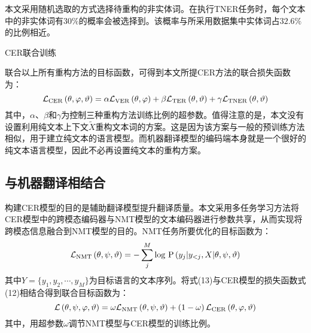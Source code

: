 本文采用随机选取的方式选择待重构的非实体词。在执行TNER任务时，每个文本中的非实体词有$30\%$的概率会被选择到。该概率与所采用数据集中实体词占$32.6\%$的比例相近。

{\sffamily CER联合训练}

联合以上所有重构方法的目标函数，可得到本文所提CER方法的联合损失函数为：
\begin{equation}
\mathcal{L}_{\rm{CER}} \left( \theta, \varphi, \vartheta \right) = \alpha \mathcal{L}_{\rm{VER}} \left( \theta, \varphi \right) + \beta \mathcal{L}_{\rm{TER}} \left( \theta, \vartheta \right) + \gamma \mathcal{L}_{\rm{TNER}} \left( \theta, \vartheta \right)
\end{equation}
其中，$\alpha$、$\beta$和$\gamma$为控制三种重构方法训练比例的超参数。值得注意的是，本文没有设置利用纯文本上下文$\tilde{X}$重构文本词的方案。这是因为该方案与一般的预训练方法相似，用于建立纯文本的语言模型。而机器翻译模型的编码端本身就是一个很好的纯文本语言模型，因此不必再设置纯文本的重构方案。

\subsection{与机器翻译相结合}
构建CER模型的目的是辅助翻译模型提升翻译质量。本文采用多任务学习方法将CER模型中的跨模态编码器与NMT模型的文本编码器进行参数共享，从而实现将跨模态信息融合到NMT模型的目的。NMT任务所要优化的目标函数为：
\begin{equation}
\mathcal{L}_{\rm{NMT}} \left( \theta, \psi, \vartheta \right) =
    -\mathop{\sum}_j^M {\rm log}{\ }{\rm P} \left(y_j \vert y_{<j}, X \vert \theta, \psi, \vartheta \right)
\end{equation}
其中$Y=\{y_1,y_2,\cdots,y_M\}$为目标语言的文本序列。将式(13)与CER模型的损失函数式(12)相结合得到联合目标函数为：
\begin{equation}
\mathcal{L} \left( \theta, \psi, \varphi, \vartheta \right) = \omega\mathcal{L}_{\rm{NMT}} \left( \theta, \psi, \vartheta \right) + \left( 1-\omega \right) \mathcal{L}_{\rm{CER}} \left( \theta, \varphi, \vartheta \right)
\end{equation}
其中，用超参数$\omega$调节NMT模型与CER模型的训练比例。